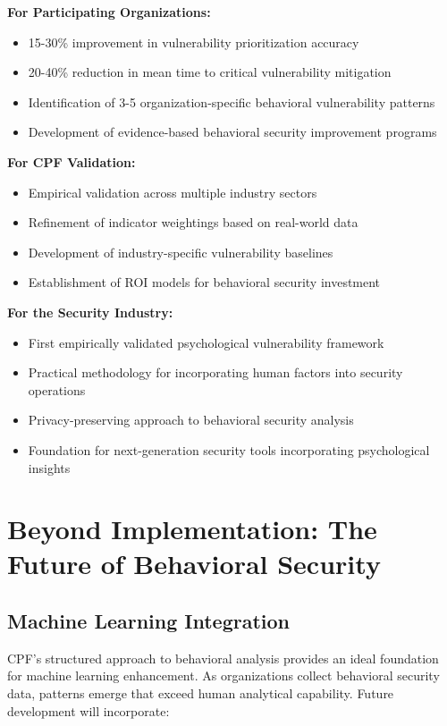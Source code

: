 \documentclass[11pt,a4paper]{article}
\begin{document}
\textbf{For Participating Organizations:}
\begin{itemize}
\item 15-30\% improvement in vulnerability prioritization accuracy
\item 20-40\% reduction in mean time to critical vulnerability mitigation
\item Identification of 3-5 organization-specific behavioral vulnerability patterns
\item Development of evidence-based behavioral security improvement programs
\end{itemize}

\textbf{For CPF Validation:}
\begin{itemize}
\item Empirical validation across multiple industry sectors
\item Refinement of indicator weightings based on real-world data
\item Development of industry-specific vulnerability baselines
\item Establishment of ROI models for behavioral security investment
\end{itemize}

\textbf{For the Security Industry:}
\begin{itemize}
\item First empirically validated psychological vulnerability framework
\item Practical methodology for incorporating human factors into security operations
\item Privacy-preserving approach to behavioral security analysis
\item Foundation for next-generation security tools incorporating psychological insights
\end{itemize}

\section{Beyond Implementation: The Future of Behavioral Security}

\subsection{Machine Learning Integration}

CPF's structured approach to behavioral analysis provides an ideal foundation for machine learning enhancement. As organizations collect behavioral security data, patterns emerge that exceed human analytical capability. Future development will incorporate:
\end{document}
